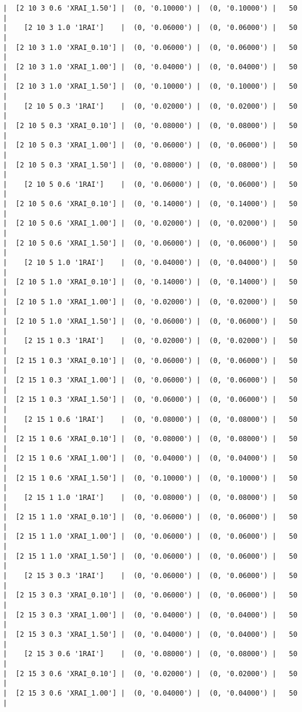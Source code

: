\documentclass{article}
\begin{document}
\begin{verbatim}
|  [2 10 3 0.6 'XRAI_1.50'] |  (0, '0.10000') |  (0, '0.10000') |   50  |
|    [2 10 3 1.0 '1RAI']    |  (0, '0.06000') |  (0, '0.06000') |   50  |
|  [2 10 3 1.0 'XRAI_0.10'] |  (0, '0.06000') |  (0, '0.06000') |   50  |
|  [2 10 3 1.0 'XRAI_1.00'] |  (0, '0.04000') |  (0, '0.04000') |   50  |
|  [2 10 3 1.0 'XRAI_1.50'] |  (0, '0.10000') |  (0, '0.10000') |   50  |
|    [2 10 5 0.3 '1RAI']    |  (0, '0.02000') |  (0, '0.02000') |   50  |
|  [2 10 5 0.3 'XRAI_0.10'] |  (0, '0.08000') |  (0, '0.08000') |   50  |
|  [2 10 5 0.3 'XRAI_1.00'] |  (0, '0.06000') |  (0, '0.06000') |   50  |
|  [2 10 5 0.3 'XRAI_1.50'] |  (0, '0.08000') |  (0, '0.08000') |   50  |
|    [2 10 5 0.6 '1RAI']    |  (0, '0.06000') |  (0, '0.06000') |   50  |
|  [2 10 5 0.6 'XRAI_0.10'] |  (0, '0.14000') |  (0, '0.14000') |   50  |
|  [2 10 5 0.6 'XRAI_1.00'] |  (0, '0.02000') |  (0, '0.02000') |   50  |
|  [2 10 5 0.6 'XRAI_1.50'] |  (0, '0.06000') |  (0, '0.06000') |   50  |
|    [2 10 5 1.0 '1RAI']    |  (0, '0.04000') |  (0, '0.04000') |   50  |
|  [2 10 5 1.0 'XRAI_0.10'] |  (0, '0.14000') |  (0, '0.14000') |   50  |
|  [2 10 5 1.0 'XRAI_1.00'] |  (0, '0.02000') |  (0, '0.02000') |   50  |
|  [2 10 5 1.0 'XRAI_1.50'] |  (0, '0.06000') |  (0, '0.06000') |   50  |
|    [2 15 1 0.3 '1RAI']    |  (0, '0.02000') |  (0, '0.02000') |   50  |
|  [2 15 1 0.3 'XRAI_0.10'] |  (0, '0.06000') |  (0, '0.06000') |   50  |
|  [2 15 1 0.3 'XRAI_1.00'] |  (0, '0.06000') |  (0, '0.06000') |   50  |
|  [2 15 1 0.3 'XRAI_1.50'] |  (0, '0.06000') |  (0, '0.06000') |   50  |
|    [2 15 1 0.6 '1RAI']    |  (0, '0.08000') |  (0, '0.08000') |   50  |
|  [2 15 1 0.6 'XRAI_0.10'] |  (0, '0.08000') |  (0, '0.08000') |   50  |
|  [2 15 1 0.6 'XRAI_1.00'] |  (0, '0.04000') |  (0, '0.04000') |   50  |
|  [2 15 1 0.6 'XRAI_1.50'] |  (0, '0.10000') |  (0, '0.10000') |   50  |
|    [2 15 1 1.0 '1RAI']    |  (0, '0.08000') |  (0, '0.08000') |   50  |
|  [2 15 1 1.0 'XRAI_0.10'] |  (0, '0.06000') |  (0, '0.06000') |   50  |
|  [2 15 1 1.0 'XRAI_1.00'] |  (0, '0.06000') |  (0, '0.06000') |   50  |
|  [2 15 1 1.0 'XRAI_1.50'] |  (0, '0.06000') |  (0, '0.06000') |   50  |
|    [2 15 3 0.3 '1RAI']    |  (0, '0.06000') |  (0, '0.06000') |   50  |
|  [2 15 3 0.3 'XRAI_0.10'] |  (0, '0.06000') |  (0, '0.06000') |   50  |
|  [2 15 3 0.3 'XRAI_1.00'] |  (0, '0.04000') |  (0, '0.04000') |   50  |
|  [2 15 3 0.3 'XRAI_1.50'] |  (0, '0.04000') |  (0, '0.04000') |   50  |
|    [2 15 3 0.6 '1RAI']    |  (0, '0.08000') |  (0, '0.08000') |   50  |
|  [2 15 3 0.6 'XRAI_0.10'] |  (0, '0.02000') |  (0, '0.02000') |   50  |
|  [2 15 3 0.6 'XRAI_1.00'] |  (0, '0.04000') |  (0, '0.04000') |   50  |

\end{verbatim}
\end{document}
